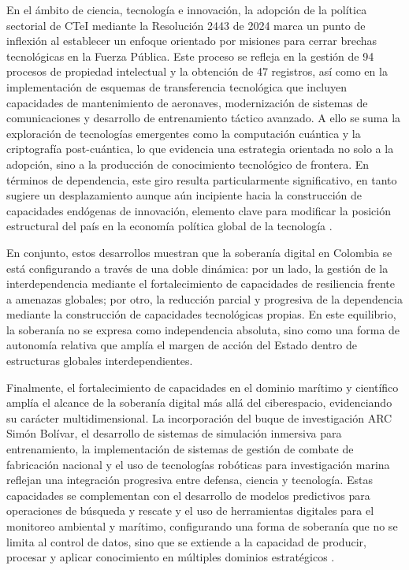 En el ámbito de ciencia, tecnología e innovación, la adopción de la política sectorial de CTeI mediante la Resolución 2443 de 2024 marca un punto de inflexión al establecer un enfoque orientado por misiones para cerrar brechas tecnológicas en la Fuerza Pública. Este proceso se refleja en la gestión de 94 procesos de propiedad intelectual y la obtención de 47 registros, así como en la implementación de esquemas de transferencia tecnológica que incluyen capacidades de mantenimiento de aeronaves, modernización de sistemas de comunicaciones y desarrollo de entrenamiento táctico avanzado. A ello se suma la exploración de tecnologías emergentes como la computación cuántica y la criptografía post-cuántica, lo que evidencia una estrategia orientada no solo a la adopción, sino a la producción de conocimiento tecnológico de frontera. En términos de dependencia, este giro resulta particularmente significativo, en tanto sugiere un desplazamiento aunque aún incipiente hacia la construcción de capacidades endógenas de innovación, elemento clave para modificar la posición estructural del país en la economía política global de la tecnología \parencite{mindefensa_audiencia_rendicion_2025,cogfm_informe_ejecutivo_2025}.

En conjunto, estos desarrollos muestran que la soberanía digital en Colombia se está configurando a través de una doble dinámica: por un lado, la gestión de la interdependencia mediante el fortalecimiento de capacidades de resiliencia frente a amenazas globales; por otro, la reducción parcial y progresiva de la dependencia mediante la construcción de capacidades tecnológicas propias. En este equilibrio, la soberanía no se expresa como independencia absoluta, sino como una forma de autonomía relativa que amplía el margen de acción del Estado dentro de estructuras globales interdependientes.

Finalmente, el fortalecimiento de capacidades en el dominio marítimo y científico amplía el alcance de la soberanía digital más allá del ciberespacio, evidenciando su carácter multidimensional. La incorporación del buque de investigación ARC Simón Bolívar, el desarrollo de sistemas de simulación inmersiva para entrenamiento, la implementación de sistemas de gestión de combate de fabricación nacional y el uso de tecnologías robóticas para investigación marina reflejan una integración progresiva entre defensa, ciencia y tecnología. Estas capacidades se complementan con el desarrollo de modelos predictivos para operaciones de búsqueda y rescate y el uso de herramientas digitales para el monitoreo ambiental y marítimo, configurando una forma de soberanía que no se limita al control de datos, sino que se extiende a la capacidad de producir, procesar y aplicar conocimiento en múltiples dominios estratégicos \parencite{arc_informe_rendicion_2023,mindefensa_audiencia_rendicion_2025}.


